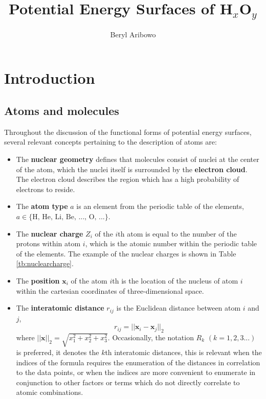 \documentclass[12pt]{article}
\title{Potential Energy Surfaces of H$_x$O$_y$}
\author{Beryl Aribowo}
\begin{document}
\maketitle

{
  \hypersetup{linkcolor=black}
  \tableofcontents
}

\section{Introduction}
\subsection{Atoms and molecules}
Throughout the discussion of the functional forms of potential energy surfaces, several relevant concepts pertaining to the description of atoms are:
\begin{itemize}
    \item The \textbf{nuclear geometry} defines that molecules consist of nuclei at the center of the atom, which the nuclei itself is surrounded by the \textbf{electron cloud}. The electron cloud describes the region which has a high probability of electrons to reside.
    
    \item The \textbf{atom type} $a$ is an element from the periodic table of the elements, $a\in\{\text{H, He, Li, Be, ..., O, ...}\}$.
    \item The \textbf{nuclear charge} $Z_i$ of the $i$th atom is equal to the number of the protons within atom $i$, which is the atomic number within the periodic table of the elements. The example of the nuclear charges is shown in Table \ref{tb:nuclearcharge}.
    
    \item The \textbf{position} $\mathbf{x}_i$ of the atom $i$th is the location of the nucleus of atom $i$ within the cartesian coordinates of three-dimensional space.
    
    \item The \textbf{interatomic distance} $r_{ij}$ is the Euclidean distance between atom $i$ and $j$, 
    \begin{equation}
        r_{ij} = ||\mathbf{x}_i - \mathbf{x}_j||_2
    \end{equation}
    where $||\mathbf{x}||_2 = \sqrt{x_1^2 + x_2^2 + x_3^2}$. Occasionally, the notation $R_k$ $(k = 1,2,3...)$ is preferred, it denotes the $k$th interatomic distances, this is relevant when the indices of the formula requires the enumeration of the distances in correlation to the data points, or when the indices are more convenient to enumerate in conjunction to other factors or terms which do not directly correlate to atomic combinations. 
\end{itemize}
\end{document}
